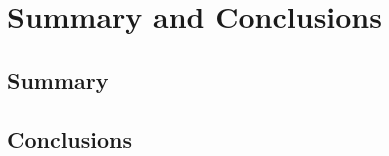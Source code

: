 \documentclass[report.tex]{subfiles}
\begin{document}
\chapter{Summary and Conclusions} %
\label{cha:summary_and_conclusions}
\section{Summary} %
\label{sec:summary}


\section{Conclusions} %
\label{sec:conclusions}


\newpage
\end{document}

